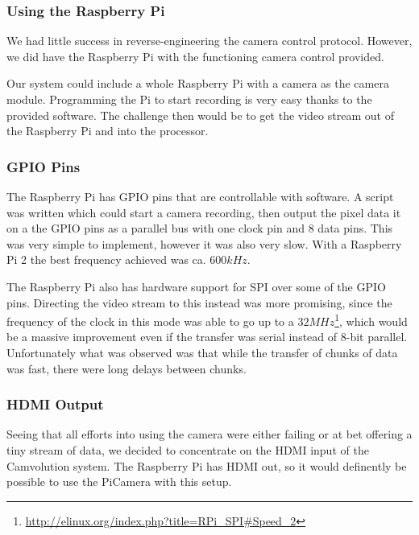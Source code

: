 \subsubsection{Using the Raspberry Pi}
We had little success in reverse-engineering the camera control protocol.
However, we did have the Raspberry Pi with the functioning camera control provided.

Our system could include a whole Raspberry Pi with a camera as the camera module.
Programming the Pi to start recording is very easy thanks to the provided software.
The challenge then would be to get the video stream out of the Raspberry Pi and into the processor.

\subsubsection{GPIO Pins}
The Raspberry Pi has GPIO pins that are controllable with software.
A script was written which could start a camera recording,
then output the pixel data it on a the GPIO pins as a parallel bus with one clock pin and 8 data pins.
This was very simple to implement, however it was also very slow.
With a Raspberry Pi 2 the best frequency achieved was ca. $600kHz$.

The Raspberry Pi also has hardware support for SPI over some of the GPIO pins.
Directing the video stream to this instead was more promising,
since the frequency of the clock in this mode was able to go up to a $32MHz$\footnote{\url{http://elinux.org/index.php?title=RPi\_SPI#Speed\_2}},
which would be a massive improvement even if the transfer was serial instead of 8-bit parallel.
Unfortunately what was observed was that while the transfer of chunks of data was fast,
there were long delays between chunks.

\subsubsection{HDMI Output}
Seeing that all efforts into using the camera were either failing or at bet offering a tiny stream of data,
we decided to concentrate on the HDMI input of the Camvolution system.
The Raspberry Pi has HDMI out, so it would definently be possible to use the PiCamera with this setup.

